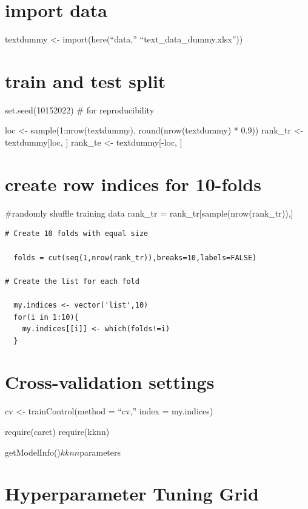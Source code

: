 \documentclass[
  english,
  man]{apa6}
\begin{document}
\hypertarget{import-data}{%
\section{import data}\label{import-data}}

textdummy \textless- import(here(``data,'' ``text\_data\_dummy.xlsx''))

\hypertarget{train-and-test-split}{%
\section{train and test split}\label{train-and-test-split}}

set.seed(10152022) \# for reproducibility

loc \textless- sample(1:nrow(textdummy), round(nrow(textdummy) * 0.9))
rank\_tr \textless- textdummy{[}loc, {]}
rank\_te \textless- textdummy{[}-loc, {]}

\hypertarget{create-row-indices-for-10-folds}{%
\section{create row indices for 10-folds}\label{create-row-indices-for-10-folds}}

\#randomly shuffle training data
rank\_tr = rank\_tr{[}sample(nrow(rank\_tr)),{]}

\begin{verbatim}
# Create 10 folds with equal size

  folds = cut(seq(1,nrow(rank_tr)),breaks=10,labels=FALSE)

# Create the list for each fold 
  
  my.indices <- vector('list',10)
  for(i in 1:10){
    my.indices[[i]] <- which(folds!=i)
  }
\end{verbatim}

\hypertarget{cross-validation-settings}{%
\section{Cross-validation settings}\label{cross-validation-settings}}

cv \textless- trainControl(method = ``cv,''
index = my.indices)

require(caret)
require(kknn)

getModelInfo()\(kknn\)parameters

\hypertarget{hyperparameter-tuning-grid}{%
\section{Hyperparameter Tuning Grid}\label{hyperparameter-tuning-grid}}
\end{document}
